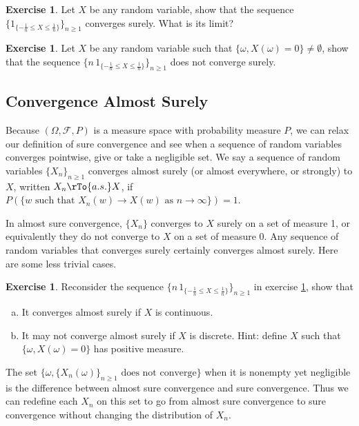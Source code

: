 \documentclass[12pt]{amsart}
\theoremstyle{definition}
\newtheorem{exercise}[theorem]{Exercise}
\begin{document}
\begin{exercise} \label{converges_surely_2} Let $X$ be any random variable, show that the sequence $\{1_{\{- \frac{1}{n} \leq X \leq \frac{1}{n}\}}\}_{n \geq 1}$ converges surely. What is its limit?
\end{exercise}

\begin{exercise} \label{converges_surely_3} Let $X$ be any random variable such that $\{\omega, X(\omega) = 0\} \neq \emptyset$, show that the sequence $\{n \, 1_{\{- \frac{1}{n} \leq X \leq \frac{1}{n}\}}\}_{n \geq 1}$ does not converge surely.
\end{exercise}

\subsection{Convergence Almost Surely} Because $(\Omega, \mathcal{F}, P)$ is a measure space with probability measure $P$, we can relax our definition of sure convergence and see when a sequence of random variables converges pointwise, give or take a negligible set.
\dfn We say a sequence of random variables $\{X_n\}_{n \geq 1}$ converges almost surely (or almost everywhere, or strongly) to $X$, written $X_n \rTo{a.s.} X$, if $P(\{w \text{ such that } X_n(w) \rightarrow X(w) \text{ as } n \rightarrow \infty\}) = 1$.

In almost sure convergence, $\{X_n\}$ converges to $X$ surely on a set of measure 1, or equivalently they do not converge to $X$ on a set of measure 0. Any sequence of random variables that converges surely certainly converges almost surely. Here are some less trivial cases.

\begin{exercise} \label{converges_almost_surely} Reconsider the sequence $\{n \, 1_{\{- \frac{1}{n} \leq X \leq \frac{1}{n}\}}\}_{n \geq 1}$ in exercise \ref{converges_surely_3}, show that
\begin{enumerate}[a.]
\item It converges almost surely if $X$ is continuous.
\item It may not converge almost surely if $X$ is discrete. Hint: define $X$ such that $\{\omega, X(\omega) = 0\}$ has positive measure.
\end{enumerate}
\end{exercise}

The set $\{\omega, \{X_n(\omega)\}_{n \geq 1} \text{ does not converge}\}$ when it is nonempty yet negligible is the difference between almost sure convergence and sure convergence. Thus we can redefine each $X_n$ on this set to go from almost sure convergence to sure convergence without changing the distribution of $X_n$.
\end{document}
